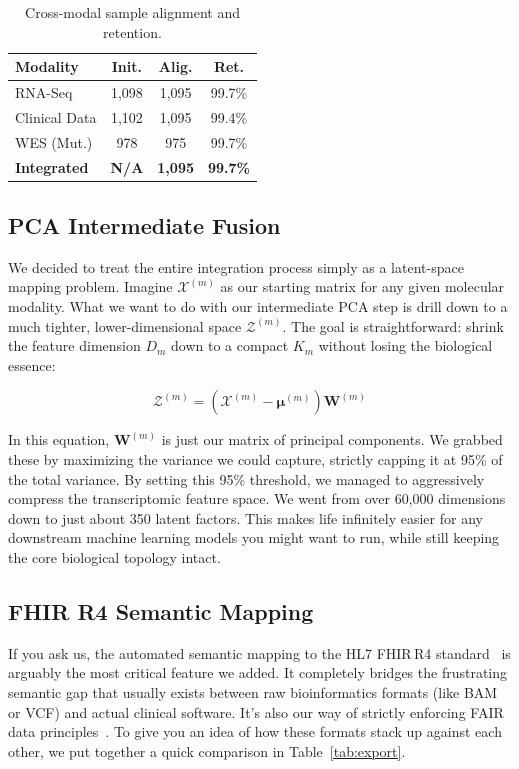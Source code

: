 \documentclass[conference,flushend]{iaria} %
\begin{document}
\begin{table}[H]
\caption{Cross-modal sample alignment and retention.}\label{tab:alignment}
\centering
\small
\renewcommand{\arraystretch}{0.95}
\setlength{\tabcolsep}{3pt}
\begin{tabularx}{\columnwidth}{X C C C}
\toprule
\textbf{Modality} & \textbf{Init.} & \textbf{Alig.} & \textbf{Ret.} \\
\midrule
RNA-Seq         & 1,098 & 1,095 & 99.7\% \\
Clinical Data   & 1,102 & 1,095 & 99.4\% \\
WES (Mut.)      & 978   & 975   & 99.7\% \\
\midrule
\textbf{Integrated} & \textbf{N/A} & \textbf{1,095} & \textbf{99.7\%} \\
\bottomrule
\end{tabularx}
\end{table}

\subsection{PCA Intermediate Fusion}
We decided to treat the entire integration process simply as a latent-space mapping problem. Imagine $\mathcal{X}^{(m)}$ as our starting matrix for any given molecular modality. What we want to do with our intermediate PCA step is drill down to a much tighter, lower-dimensional space $\mathcal{Z}^{(m)}$. The goal is straightforward: shrink the feature dimension $D_m$ down to a compact $K_m$ without losing the biological essence:

\begin{equation}
\mathcal{Z}^{(m)} = (\mathcal{X}^{(m)} - \mathbf{\mu}^{(m)}) \mathbf{W}^{(m)}
\end{equation}

In this equation, $\mathbf{W}^{(m)}$ is just our matrix of principal components. We grabbed these by maximizing the variance we could capture, strictly capping it at 95\% of the total variance. By setting this 95\% threshold, we managed to aggressively compress the transcriptomic feature space. We went from over 60,000 dimensions down to just about 350 latent factors. This makes life infinitely easier for any downstream machine learning models you might want to run, while still keeping the core biological topology intact.

\subsection{FHIR R4 Semantic Mapping}
If you ask us, the automated semantic mapping to the HL7 FHIR\,R4 standard~\cite{hl7fhir} is arguably the most critical feature we added. It completely bridges the frustrating semantic gap that usually exists between raw bioinformatics formats (like BAM or VCF) and actual clinical software. It's also our way of strictly enforcing FAIR data principles~\cite{wilkinson2016}. To give you an idea of how these formats stack up against each other, we put together a quick comparison in Table~\ref{tab:export}.
\end{document}
